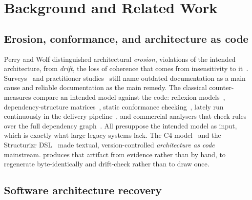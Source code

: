 \section{Background and Related Work}
\label{sec:background}


\subsection{Erosion, conformance, and architecture as code}

Perry and Wolf distinguished architectural \emph{erosion}, violations of the intended architecture,
from \emph{drift}, the loss of coherence that comes from insensitivity to
it~\cite{perry1992foundations}. Surveys~\cite{desilva2012erosion,li2022erosion} and practitioner
studies~\cite{anthony2024drift,ali2018consistency} still name outdated documentation as a main
cause and reliable documentation as the main remedy. The classical counter-measures compare an
intended model against the code: reflexion models~\cite{murphy2001reflexion},
dependency-structure matrices~\cite{sangal2005dsm}, static conformance
checking~\cite{knodel2007comparison,passos2010conformance}, lately run continuously in the
delivery pipeline~\cite{bucaioni2024conformance}, and commercial analysers that check rules over
the full dependency graph~\cite{understand,ndepend}. All presuppose the intended model as input,
which is exactly what large legacy systems lack. The C4 model~\cite{brown2026c4} and the
Structurizr DSL~\cite{structurizrdsl} made textual, version-controlled \emph{architecture as
code}~\cite{bucaioni2025aac} mainstream. \tool{} produces that artifact from evidence rather than
by hand, to regenerate byte-identically and drift-check rather than to draw once.

\subsection{Software architecture recovery}


